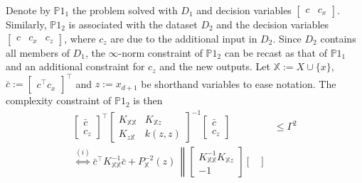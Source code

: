 \begin{my_proof}
		Denote by $\mathds{P}1_1$ the problem solved with $D_1$ and decision variables $\begin{bmatrix} c & c_x \end{bmatrix}$. Similarly, $\mathds{P}1_2$ is associated with the dataset $D_2$ and the decision variables $\begin{bmatrix} c & c_x & c_z \end{bmatrix}$, where $c_z$ are due to the additional input in $D_2$. Since $D_2$ contains all members of $D_1$, the $\infty$-norm constraint of $\mathds{P}1_2$ can be recast as that of $\mathds{P}1_1$ and an additional constraint for $c_z$ and the new outputs. Let $\mathds{X}  := X \cup \{x\}$, $\bar c := \begin{bmatrix} c^\top c_x \end{bmatrix}^\top$ and $z := x_{d+1}$ be shorthand variables to ease notation. The complexity constraint of $\mathds{P}1_2$ is then
		\begin{subequations}
			\begin{align}
				\begin{bmatrix}
					\bar c \\
					c_z
				\end{bmatrix}^\top 
				\begin{bmatrix}
					K_{\mathds{X} \mathds{X} } & K_{\mathds{X}  z} \\
					K_{z \mathds{X} } & k(z,z)
				\end{bmatrix}^{-1} 
				\begin{bmatrix}
					\bar c \\
					c_z
				\end{bmatrix} & \leq \Gamma^2 \\
				\overset{(i)}{\Leftrightarrow}
				\bar c^\top K_{\mathds{X} \mathds{X} }^{-1} \bar c +
				P_{\mathds{X} }^{-2}(z) \, 
				\left\|
				\begin{bmatrix}
					K_{\mathds{X} \mathds{X} }^{-1} K_{\mathds{X} z} \\
					-1
				\end{bmatrix}
				\begin{bmatrix}

\end{bmatrix}
\end{align}
\end{subequations}
\end{my_proof}
